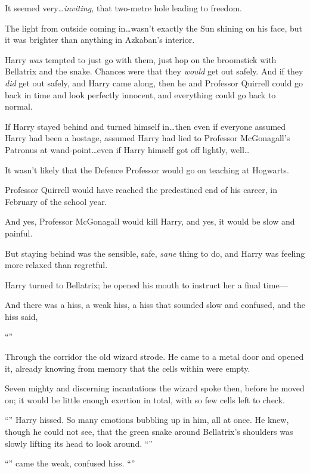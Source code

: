 It seemed very…\emph{inviting,} that two-metre hole leading to freedom.

The light from outside coming in…wasn’t exactly the Sun shining on his face, but it was brighter than anything in Azkaban’s interior.

Harry \emph{was} tempted to just go with them, just hop on the broomstick with Bellatrix and the snake. Chances were that they \emph{would} get out safely. And if they \emph{did} get out safely, and Harry came along, then he and Professor Quirrell could go back in time and look perfectly innocent, and everything could go back to normal.

If Harry stayed behind and turned himself in…then even if everyone assumed Harry had been a hostage, assumed Harry had lied to Professor McGonagall’s Patronus at wand-point…even if Harry himself got off lightly, well…

It wasn’t likely that the Defence Professor would go on teaching at Hogwarts.

Professor Quirrell would have reached the predestined end of his career, in February of the school year.

And yes, Professor McGonagall would kill Harry, and yes, it would be slow and painful.

But staying behind was the sensible, safe, \emph{sane} thing to do, and Harry was feeling more relaxed than regretful.

Harry turned to Bellatrix; he opened his mouth to instruct her a final time—

And there was a hiss, a weak hiss, a hiss that sounded slow and confused, and the hiss said,

“”

\later

Through the corridor the old wizard strode. He came to a metal door and opened it, already knowing from memory that the cells within were empty.

Seven mighty and discerning incantations the wizard spoke then, before he moved on; it would be little enough exertion in total, with so few cells left to check.

\later

“” Harry hissed. So many emotions bubbling up in him, all at once. He knew, though he could not see, that the green snake around Bellatrix’s shoulders was slowly lifting its head to look around. “”

“” came the weak, confused hiss. “”

